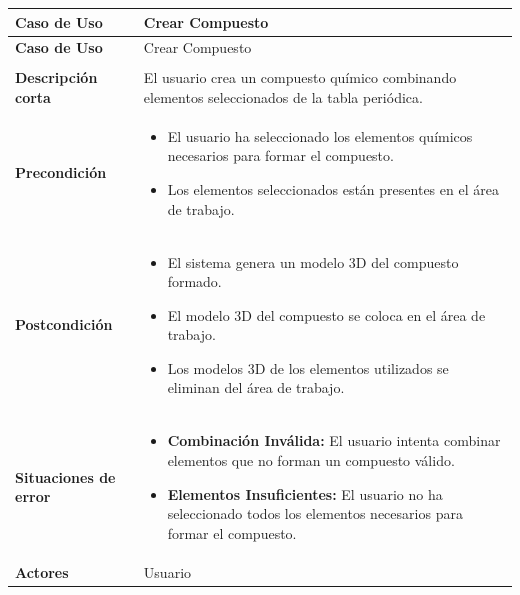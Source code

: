 \begin{longtable}{>{\raggedright\arraybackslash}m{} >{\raggedright\arraybackslash}m{}}
    \toprule\toprule
    \textbf{Caso de Uso} &  Crear Compuesto \\
    \midrule\midrule
    \endfirsthead

    \toprule\toprule
    \textbf{Caso de Uso} &  Crear Compuesto \\
    \midrule\midrule
    \endhead

    \midrule
    \multicolumn{2}{r}{\textit{Continúa en la siguiente página}} \\
    \midrule
    \endfoot

    \endlastfoot

    \textbf{Descripción corta} &  El usuario crea un compuesto químico combinando elementos seleccionados de la tabla periódica. \\
    \midrule
    \textbf{Precondición} & 
    \begin{itemize}
        \item El usuario ha seleccionado los elementos químicos necesarios para formar el compuesto. 
        \item Los elementos seleccionados están presentes en el área de trabajo. 
    \end{itemize}\\
    \midrule
    \textbf{Postcondición} & 
    \begin{itemize}
        \item El sistema genera un modelo 3D del compuesto formado. 
        \item El modelo 3D del compuesto se coloca en el área de trabajo. 
        \item Los modelos 3D de los elementos utilizados se eliminan del área de trabajo. 
    \end{itemize}\\
    \midrule
    \textbf{Situaciones de error} & 
    \begin{itemize}
        \item \textbf{Combinación Inválida: }El usuario intenta combinar elementos que no forman un compuesto válido. 
        \item \textbf{Elementos Insuficientes: }El usuario no ha seleccionado todos los elementos necesarios para formar el compuesto. 
    \end{itemize}\\
    \midrule
    \textbf{Actores} & Usuario \\
    \midrule

\end{longtable}
